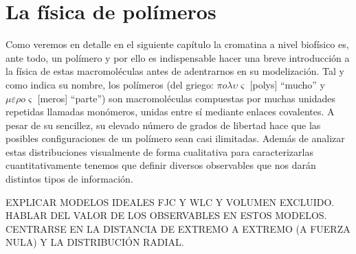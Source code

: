 \section{La física de polímeros}

Como veremos en detalle en el siguiente capítulo la cromatina a nivel biofísico es, ante todo, un polímero y por ello es indispensable hacer una breve introducción a la física de estas macromoléculas antes de adentrarnos en su modelización. Tal y como indica su nombre, los polímeros (del griego: $\pi o \lambda \upsilon \varsigma$ [polys] ``mucho'' y $\mu \varepsilon \rho o \varsigma$ [meros] ``parte'') son macromoléculas compuestas por muchas unidades repetidas llamadas monómeros, unidas entre sí mediante enlaces covalentes. A pesar de su sencillez, su elevado número de grados de libertad hace que las posibles configuraciones de un polímero sean casi ilimitadas. Además de analizar estas distribuciones visualmente de forma cualitativa para caracterizarlas cuantitativamente tenemos que definir diversos observables que nos darán distintos tipos de información.

EXPLICAR MODELOS IDEALES FJC Y WLC Y VOLUMEN EXCLUIDO. HABLAR DEL VALOR DE LOS OBSERVABLES EN ESTOS MODELOS. CENTRARSE EN LA DISTANCIA DE EXTREMO A EXTREMO (A FUERZA NULA) Y LA DISTRIBUCIÓN RADIAL.
